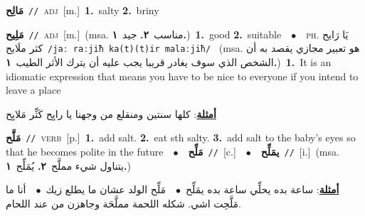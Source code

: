\documentclass[10pt,a4paper,twoside]{article} %
\begin{document}
\begin{multicols}{2}
{\setlength\topsep{0pt}\textbf{\foreignlanguage{arabic}{مَالِح}}\ {\color{gray}\texttt{//}\color{black}}\ \textsc{adj}\ [m.]\ \textbf{1.}~salty  \textbf{2.}~briny\ } \vspace{2mm}

{\setlength\topsep{0pt}\textbf{\foreignlanguage{arabic}{مَلِيح}}\ {\color{gray}\texttt{//}\color{black}}\ \textsc{adj}\ [m.]\ \color{gray}(msa. \foreignlanguage{arabic}{مناسب}~\foreignlanguage{arabic}{\textbf{٢.}}  \foreignlanguage{arabic}{جيد}~\foreignlanguage{arabic}{\textbf{١.}})\color{black}\ \textbf{1.}~good  \textbf{2.}~suitable\ \ $\bullet$\ \ \textsc{ph.} \color{gray} \foreignlanguage{arabic}{يَا رَايح كثر ملَايح}\color{black}\ {\color{gray}\texttt{/{\sffamily jaː raːjiħ ka(t)(t)ir malaːjiħ}/}\color{black}}\ \color{gray} (msa. \foreignlanguage{arabic}{هو تعبير مجازي يقصد به أن الشخص الذي سوف يغادر قريبا يجب عليه أن يترك الأثر الطيب}~\foreignlanguage{arabic}{\textbf{١.}})\color{black}\ \textbf{1.}~It is an idiomatic expression that means you have to be nice to everyone if you intend to leave a place\  \begin{flushright}\color{gray}\foreignlanguage{arabic}{\textbf{\underline{\foreignlanguage{arabic}{أمثلة}}}: كلها سنتين ومنقلع من وجهنا يا رايِح كَثِّر مَلايِح}\end{flushright}\color{black}} \vspace{2mm}

{\setlength\topsep{0pt}\textbf{\foreignlanguage{arabic}{مَلَّح}}\ {\color{gray}\texttt{//}\color{black}}\ \textsc{verb}\ [p.]\ \textbf{1.}~add salt.  \textbf{2.}~eat sth salty.  \textbf{3.}~add salt to the baby's eyes so that he becomes polite in the future\ \ $\bullet$\ \ \setlength\topsep{0pt}\textbf{\foreignlanguage{arabic}{مَلِّح}}\ {\color{gray}\texttt{//}\color{black}}\ [c.]\ \ $\bullet$\ \ \setlength\topsep{0pt}\textbf{\foreignlanguage{arabic}{يمَلِّح}}\ {\color{gray}\texttt{//}\color{black}}\ [i.]\ \color{gray}(msa. \foreignlanguage{arabic}{يتناول شيء مملَّح}~\foreignlanguage{arabic}{\textbf{٢.}}  \foreignlanguage{arabic}{يُمَلِّح}~\foreignlanguage{arabic}{\textbf{١.}})\color{black}\  \begin{flushright}\color{gray}\foreignlanguage{arabic}{\textbf{\underline{\foreignlanguage{arabic}{أمثلة}}}: ساعة بده يحلِّي ساعة بده يمَلِّح\ $\bullet$\ \  مَلِّح الولد عشان ما يطلع زيك\ $\bullet$\ \  أنا ما مَلَّحِت اشي. شكله اللحمة مملَّحَة وجاهزن من عند اللحام.}\end{flushright}\color{black}} \vspace{2mm}


\end{multicols}
\end{document}

